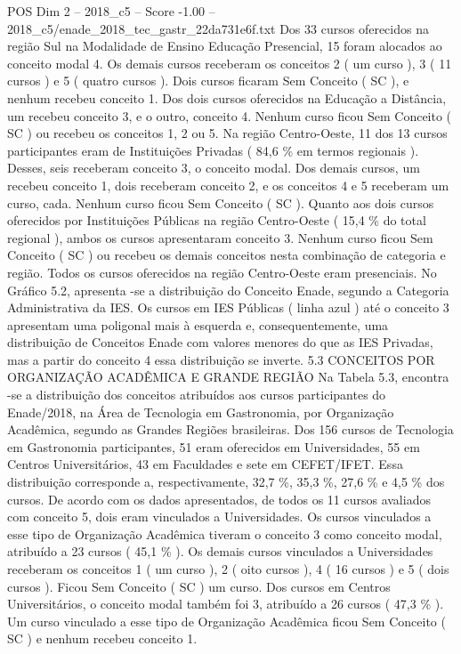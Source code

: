 \begin{textsample}{POS Dim 2 – 2018\_c5 – Score -1.00 – 2018\_c5/enade\_2018\_tec\_gastr\_22da731e6f.txt}
Dos 33 cursos oferecidos na região Sul na Modalidade de Ensino Educação Presencial, 15 foram alocados ao conceito modal 4.
Os demais cursos receberam os conceitos 2 ( um curso ), 3 ( 11 cursos ) e 5 ( quatro cursos ).
Dois cursos ficaram Sem Conceito ( SC ), e nenhum recebeu conceito 1.
Dos dois cursos oferecidos na Educação a Distância, um recebeu conceito 3, e o outro, conceito 4.
Nenhum curso ficou Sem Conceito ( SC ) ou recebeu os conceitos 1, 2 ou 5.
Na região Centro-Oeste, 11 dos 13 cursos participantes eram de Instituições Privadas ( 84,6 \% em termos regionais ).
Desses, seis receberam conceito 3, o conceito modal.
Dos demais cursos, um recebeu conceito 1, dois receberam conceito 2, e os conceitos 4 e 5 receberam um curso, cada.
Nenhum curso ficou Sem Conceito ( SC ).
Quanto aos dois cursos oferecidos por Instituições Públicas na região Centro-Oeste ( 15,4 \% do total regional ), ambos os cursos apresentaram conceito 3.
Nenhum curso ficou Sem Conceito ( SC ) ou recebeu os demais conceitos nesta combinação de categoria e região.
Todos os cursos oferecidos na região Centro-Oeste eram presenciais.
No Gráfico 5.2, apresenta -se a distribuição do Conceito Enade, segundo a Categoria Administrativa da IES.
Os cursos em IES Públicas ( linha azul ) até o conceito 3 apresentam uma poligonal mais à esquerda e, consequentemente, uma distribuição de Conceitos Enade com valores menores do que as IES Privadas, mas a partir do conceito 4 essa distribuição se inverte. 5.3 CONCEITOS POR ORGANIZAÇÃO ACADÊMICA E GRANDE REGIÃO Na Tabela 5.3, encontra -se a distribuição dos conceitos atribuídos aos cursos participantes do Enade/2018, na Área de Tecnologia em Gastronomia, por Organização Acadêmica, segundo as Grandes Regiões brasileiras.
Dos 156 cursos de Tecnologia em Gastronomia participantes, 51 eram oferecidos em Universidades, 55 em Centros Universitários, 43 em Faculdades e sete em CEFET/IFET.
Essa distribuição corresponde a, respectivamente, 32,7 \%, 35,3 \%, 27,6 \% e 4,5 \% dos cursos.
De acordo com os dados apresentados, de todos os 11 cursos avaliados com conceito 5, dois eram vinculados a Universidades.
Os cursos vinculados a esse tipo de Organização Acadêmica tiveram o conceito 3 como conceito modal, atribuído a 23 cursos ( 45,1 \% ).
Os demais cursos vinculados a Universidades receberam os conceitos 1 ( um curso ), 2 ( oito cursos ), 4 ( 16 cursos ) e 5 ( dois cursos ).
Ficou Sem Conceito ( SC ) um curso.
Dos cursos em Centros Universitários, o conceito modal também foi 3, atribuído a 26 cursos ( 47,3 \% ).
Um curso vinculado a esse tipo de Organização Acadêmica ficou Sem Conceito ( SC ) e nenhum recebeu conceito 1.

\end{textsample}
